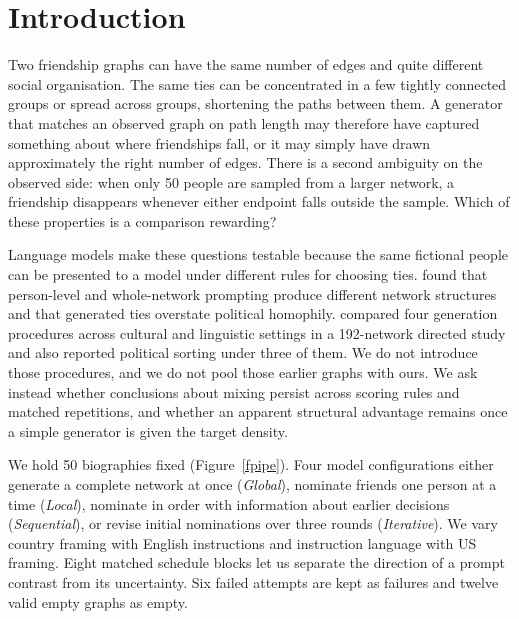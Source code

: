 \documentclass{article}
\begin{document}
\section{Introduction}
Two friendship graphs can have the same number of edges and quite different social organisation. The same ties can be concentrated in a few tightly connected groups or spread across groups, shortening the paths between them. A generator that matches an observed graph on path length may therefore have captured something about where friendships fall, or it may simply have drawn approximately the right number of edges. There is a second ambiguity on the observed side: when only 50 people are sampled from a larger network, a friendship disappears whenever either endpoint falls outside the sample. Which of these properties is a comparison rewarding?

Language models make these questions testable because the same fictional people can be presented to a model under different rules for choosing ties. \citet{chang} found that person-level and whole-network prompting produce different network structures and that generated ties overstate political homophily. \citet{kilaru} compared four generation procedures across cultural and linguistic settings in a 192-network directed study and also reported political sorting under three of them. We do not introduce those procedures, and we do not pool those earlier graphs with ours. We ask instead whether conclusions about mixing persist across scoring rules and matched repetitions, and whether an apparent structural advantage remains once a simple generator is given the target density.

We hold 50 biographies fixed (Figure~\ref{fpipe}). Four model configurations either generate a complete network at once (\emph{Global}), nominate friends one person at a time (\emph{Local}), nominate in order with information about earlier decisions (\emph{Sequential}), or revise initial nominations over three rounds (\emph{Iterative}). We vary country framing with English instructions and instruction language with US framing. Eight matched schedule blocks let us separate the direction of a prompt contrast from its uncertainty. Six failed attempts are kept as failures and twelve valid empty graphs as empty.
\end{document}
